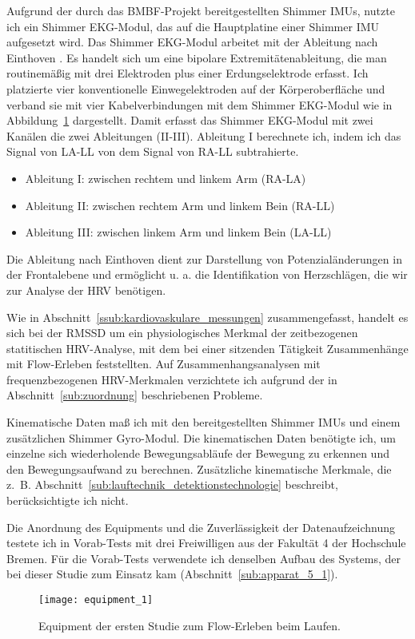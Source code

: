 Aufgrund der durch das \acs{BMBF}-Projekt bereitgestellten Shimmer \acp{IMU}, nutzte ich ein Shimmer EKG-Modul, das auf die Hauptplatine einer Shimmer \ac{IMU} aufgesetzt wird. Das Shimmer EKG-Modul arbeitet mit der Ableitung nach Einthoven \citep[][S.~85ff.]{Behrends2002}. Es handelt sich um eine bipolare Extremitätenableitung, die man routinemäßig mit drei Elektroden plus einer Erdungselektrode erfasst. Ich platzierte vier konventionelle Einwegelektroden auf der Körperoberfläche und verband sie mit vier Kabelverbindungen mit dem Shimmer EKG-Modul wie in Abbildung~\ref{fig:equipment_1} dargestellt. Damit erfasst das Shimmer EKG-Modul mit zwei Kanälen die zwei Ableitungen (II-III). Ableitung I berechnete ich, indem ich das Signal von LA-LL von dem Signal von RA-LL subtrahierte. 
\begin{itemize}
	\item Ableitung I: zwischen rechtem und linkem Arm (RA-LA) 
	\item Ableitung II: zwischen rechtem Arm und linkem Bein (RA-LL) 
	\item Ableitung III: zwischen linkem Arm und linkem Bein (LA-LL) 
\end{itemize}

Die Ableitung nach Einthoven dient zur Darstellung von Potenzialänderungen in der Frontalebene und ermöglicht u. a. die Identifikation von Herzschlägen, die wir zur Analyse der \ac{HRV} benötigen.

Wie in Abschnitt~\ref{ssub:kardiovaskulare_messungen} zusammengefasst, handelt es sich bei der \acs{RMSSD} um ein physiologisches Merkmal der zeitbezogenen statitischen \ac{HRV}-Analyse, mit dem \citet{Keller2011} bei einer sitzenden Tätigkeit Zusammenhänge mit Flow-Erleben feststellten. Auf Zusammenhangsanalysen mit frequenzbezogenen \ac{HRV}-Merkmalen verzichtete ich aufgrund der in Abschnitt~\ref{sub:zuordnung} beschriebenen Probleme.

Kinematische Daten maß ich mit den bereitgestellten Shimmer \acp{IMU} und einem zusätzlichen Shimmer Gyro-Modul. Die kinematischen Daten benötigte ich, um einzelne sich wiederholende Bewegungsabläufe der Bewegung zu erkennen und den Bewegungsaufwand zu berechnen. Zusätzliche kinematische Merkmale, die z.~B. Abschnitt~\ref{sub:lauftechnik_detektionstechnologie} beschreibt, berücksichtigte ich nicht.

Die Anordnung des Equipments und die Zuverlässigkeit der Datenaufzeichnung testete ich in Vorab-Tests mit drei Freiwilligen aus der Fakultät 4 der Hochschule Bremen. Für die Vorab-Tests verwendete ich denselben Aufbau des Systems, der bei dieser Studie zum Einsatz kam (Abschnitt~\ref{sub:apparat_5_1}). 
\begin{figure}
	[!htb] \centering 
	\texttt{[image: equipment\_1]} \caption[Equipment der ersten Studie zum Flow-Erleben beim Laufen.]{Equipment der ersten Studie zum Flow-Erleben beim Laufen.} \label{fig:equipment_1} 
\end{figure}

